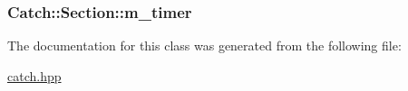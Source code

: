 \hypertarget{class_catch_1_1_section_a1548993afa64305a1b093391c6884b7e}{
\subsubsection[{m\-\_\-timer}]{ Catch\-::\-Section\-::m\-\_\-timer\hspace{0.3cm}{\ttfamily [private]}}}\label{class_catch_1_1_section_a1548993afa64305a1b093391c6884b7e}


The documentation for this class was generated from the following file\-:\begin{DoxyCompactItemize}
\item 
\hyperlink{catch_8hpp}{catch.\-hpp}\end{DoxyCompactItemize}
